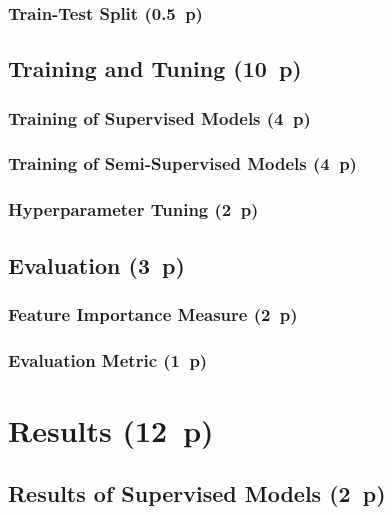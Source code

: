 \subsubsection{Train-Test Split (0.5~p)}\label{sec:train-test-split}

\subsection{Training and Tuning (10~p)}\label{sec:training-and-tuning}

\subsubsection{Training of Supervised
  Models (4~p)}\label{sec:training-of-supervised-models}


\subsubsection{Training of Semi-Supervised
  Models (4~p)}\label{sec:training-of-semi-supervised-models}


\subsubsection{Hyperparameter Tuning (2~p)}\label{sec:hyperparameter-tuning}


\subsection{Evaluation (3~p)}\label{sec:evaluation}

\subsubsection{Feature Importance
  Measure (2~p)}\label{sec:feature-importance-measure}

\subsubsection{Evaluation Metric (1~p)}\label{sec:evaluation-metric}

\newpage
\section{Results (12~p)}\label{sec:results}

\subsection{Results of Supervised
  Models (2~p)}\label{sec:results-of-supervised-models}

